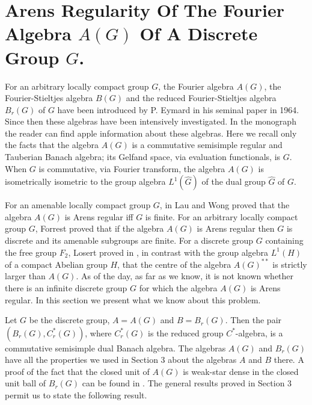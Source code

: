 \documentclass[12pt, twoside, leqno]{article}
\theoremstyle{definition}
\theoremstyle{definition}
\numberwithin{equation}{section}
\begin{document}
\section{Arens Regularity Of The Fourier Algebra $ A(G) $ Of A Discrete Group $ G $.}
 For an arbitrary locally compact group $ G $, the Fourier algebra $ A(G) $, the Fourier-Stieltjes algebra $ B(G) $ and the reduced Fourier-Stieltjes algebra $ B_{r}(G) $ of $ G $ have been introduced by P. Eymard in his seminal paper \cite {Eymard_01}  in 1964. Since then these algebras have been intensively investigated. In the monograph \cite{Kaniuth_lau_01} the reader can find apple information about these algebras. Here we recall only the facts that the algebra $ A(G) $ is a commutative semisimple regular and Tauberian Banach algebra; its Gelfand space, via evaluation functionals, is $ G $. When $ G $ is commutative, via Fourier transform, the algebra $ A(G) $ is isometrically isometric to the group algebra $ L^{1}(\hat{G}) $ of the dual group $ \hat{G} $ of $ G $.\vspace{2mm}
 
 For an amenable locally compact group $ G $, in \cite{lau_wong_01}  Lau and Wong proved that the algebra $ A(G) $ is Arens regular iff $ G $ is finite. For an arbitrary locally compact group $ G $, Forrest \cite {b_forrest_01}  proved that if the algebra $ A(G) $ is Arens regular then $ G $ is discrete and its amenable subgroups are finite. For a discrete group $ G $ containing the free group $ F_{2} $, Losert proved in \cite {losert_01}, in contrast with the group algebra $ L^{1}(H) $ of a compact Abelian group $ H $, that the centre of the algebra $ A(G)^{**} $ is strictly larger than $ A(G) $. As of the day, as far as we know, it is not known whether there is an infinite discrete group $ G $ for which the algebra $ A(G) $ is Arens regular. In this section we present what we know about this problem.\vspace{2mm}
 
 Let $ G $ be the discrete group, $ A=A(G) $ and $ B=B_{r}(G) $. Then the pair $ (B_{r}(G),C^{*}_{r}(G)) $, where $ C_{r}^{*}(G) $ is the reduced group $ C^{*} $-algebra, is a commutative semisimple dual Banach algebra. The algebras $ A(G) $ and $ B_{r}(G) $ have all the properties we used in Section 3 about the algebras $ A $ and $ B $ there. A proof of the fact that the closed unit of $ A(G) $ is weak-star dense in the closed unit ball of $ B_{r}(G) $ can be found in \cite [Theorem 4.3.25]{dales_ulger_02}. The general results proved in Section 3 permit us to state the following result.
 
\end{document}
